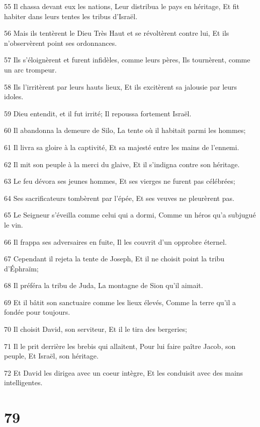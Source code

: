 \par 55 Il chassa devant eux les nations, Leur distribua le pays en héritage, Et fit habiter dans leurs tentes les tribus d'Israël.
\par 56 Mais ils tentèrent le Dieu Très Haut et se révoltèrent contre lui, Et ils n'observèrent point ses ordonnances.
\par 57 Ils s'éloignèrent et furent infidèles, comme leurs pères, Ils tournèrent, comme un arc trompeur.
\par 58 Ils l'irritèrent par leurs hauts lieux, Et ils excitèrent sa jalousie par leurs idoles.
\par 59 Dieu entendit, et il fut irrité; Il repoussa fortement Israël.
\par 60 Il abandonna la demeure de Silo, La tente où il habitait parmi les hommes;
\par 61 Il livra sa gloire à la captivité, Et sa majesté entre les mains de l'ennemi.
\par 62 Il mit son peuple à la merci du glaive, Et il s'indigna contre son héritage.
\par 63 Le feu dévora ses jeunes hommes, Et ses vierges ne furent pas célébrées;
\par 64 Ses sacrificateurs tombèrent par l'épée, Et ses veuves ne pleurèrent pas.
\par 65 Le Seigneur s'éveilla comme celui qui a dormi, Comme un héros qu'a subjugué le vin.
\par 66 Il frappa ses adversaires en fuite, Il les couvrit d'un opprobre éternel.
\par 67 Cependant il rejeta la tente de Joseph, Et il ne choisit point la tribu d'Éphraïm;
\par 68 Il préféra la tribu de Juda, La montagne de Sion qu'il aimait.
\par 69 Et il bâtit son sanctuaire comme les lieux élevés, Comme la terre qu'il a fondée pour toujours.
\par 70 Il choisit David, son serviteur, Et il le tira des bergeries;
\par 71 Il le prit derrière les brebis qui allaitent, Pour lui faire paître Jacob, son peuple, Et Israël, son héritage.
\par 72 Et David les dirigea avec un coeur intègre, Et les conduisit avec des mains intelligentes.

\chapter{79}


